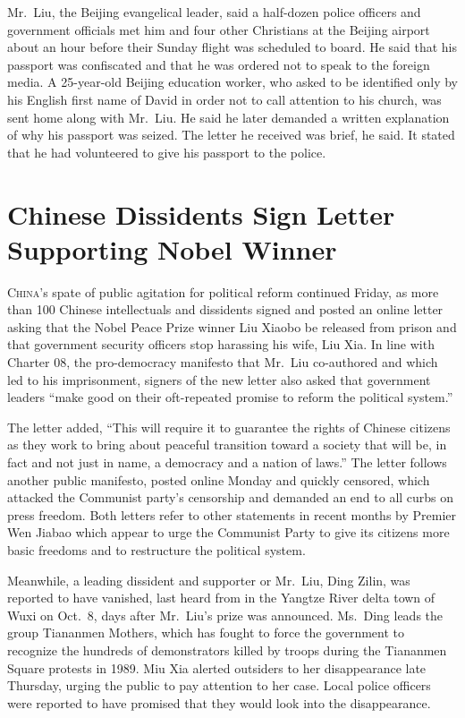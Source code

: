 ﻿\documentclass[12pt]{article}
\begin{document}
Mr.~Liu, the Beijing evangelical leader, said a half-dozen police officers and government officials
met him and four other Christians at the Beijing airport about an hour before their Sunday flight
was scheduled to board. He said that his passport was confiscated and that he was ordered not to
speak to the foreign media. A 25-year-old Beijing education worker, who asked to be identified only
by his English first name of David in order not to call attention to his church, was sent home along
with Mr.~Liu. He said he later demanded a written explanation of why his passport was seized. The
letter he received was brief, he said. It stated that he had volunteered to give his passport to the
police.

\section{Chinese Dissidents Sign Letter Supporting Nobel Winner}

\lettrine{C}{hina}'s spate of public agitation for political reform
continued Friday, as more than 100 Chinese intellectuals and dissidents signed and posted an online
letter asking that the Nobel Peace Prize winner Liu Xiaobo be released from prison and that
government security officers stop harassing his wife, Liu Xia. In line with Charter 08, the
pro-democracy manifesto that Mr.~Liu co-authored and which led to his imprisonment, signers of the
new letter also asked that government leaders ``make good on their oft-repeated promise to reform
the political system.''

The letter added, ``This will require it to guarantee the rights of Chinese citizens as they work to
bring about peaceful transition toward a society that will be, in fact and not just in name, a
democracy and a nation of laws.'' The letter follows another public manifesto, posted online Monday
and quickly censored, which attacked the Communist party's censorship and demanded an end to all
curbs on press freedom. Both letters refer to other statements in recent months by Premier Wen
Jiabao which appear to urge the Communist Party to give its citizens more basic freedoms and to
restructure the political system.

Meanwhile, a leading dissident and supporter or Mr.~Liu, Ding Zilin, was reported to have vanished,
last heard from in the Yangtze River delta town of Wuxi on Oct.~8, days after Mr.~Liu's prize was
announced. Ms.~Ding leads the group Tiananmen Mothers, which has fought to force the government to
recognize the hundreds of demonstrators killed by troops during the Tiananmen Square protests in
1989. Miu Xia alerted outsiders to her disappearance late Thursday, urging the public to pay
attention to her case. Local police officers were reported to have promised that they would look
into the disappearance.
\end{document}
